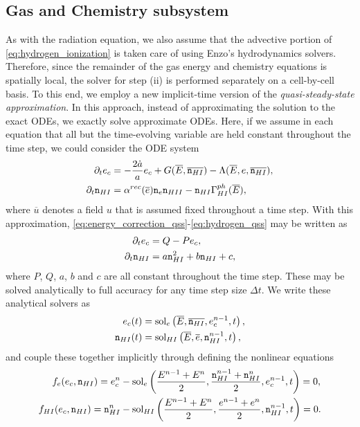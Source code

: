 \documentclass[letterpaper,10pt]{article}
\renewcommand{\(}{\left(}
\renewcommand{\)}{\right)}
\newcommand{\dt}{\Delta t}
\newcommand{\mn}{{\tt n}}
\begin{document}
\subsection{Gas and Chemistry subsystem}
\label{sec:analytic_solve}

As with the radiation equation, we also assume that the advective
portion of \eqref{eq:hydrogen_ionization} is taken care of using
Enzo's hydrodynamics solvers.  Therefore, since the remainder of the
gas energy and chemistry equations is spatially local, the solver for
step (ii) is performed separately on a cell-by-cell basis.  To this
end, we employ a new implicit-time version of the 
{\em quasi-steady-state approximation}.  In this approach, instead of
approximating the solution to the exact ODEs, we exactly solve
approximate ODEs.  Here, if we assume in each equation that all but the
time-evolving variable are held constant throughout the time step, we
could consider the ODE system 
\begin{align}
  \label{eq:energy_correction_qss}
  \partial_t e_c &= -\frac{2\dot{a}}{a}e_c + G(\overline{E},\overline{\mn_{HI}}) - \Lambda(\overline{E},e,\overline{\mn_{HI}}), \\
  \label{eq:hydrogen_qss}
  \partial_t \mn_{HI} &= \alpha^{rec}(\overline{e}) \mn_e \mn_{HII} - \mn_{HI} \Gamma_{HI}^{ph}(\overline{E}),
\end{align}
where $\overline{u}$ denotes a field $u$ that is assumed fixed
throughout a time step.  With this approximation,
\eqref{eq:energy_correction_qss}-\eqref{eq:hydrogen_qss} may be
written as
\begin{align}
  \label{eq:energy_correction_qss2}
  \partial_t e_c &= Q - Pe_c, \\
  \label{eq:hydrogen_qss2}
  \partial_t \mn_{HI} &= a \mn_{HI}^2 + b\mn_{HI} + c,
\end{align}
where $P$, $Q$, $a$, $b$ and $c$ are all constant throughout the time
step.  These may be solved analytically to full accuracy for any time step
size $\dt$.  We write these analytical solvers as
\begin{align}
  \label{eq:energy_correction_qss3}
  e_c(t) &= \text{sol}_e\left(\overline{E},\overline{\mn_{HI}},e_c^{n-1},t\right), \\
  \label{eq:hydrogen_qss3}
  \mn_{HI}(t) &= \text{sol}_{HI}\left(\overline{E},\overline{e},\mn_{HI}^{n-1},t\right),
\end{align}
and couple these together implicitly through defining the nonlinear
equations 
\begin{align}
  \label{eq:energy_correction_iqss}
  f_e(e_c,\mn_{HI}) = e_c^n &- \text{sol}_e\left(\frac{E^{n-1}+E^n}{2},\frac{\mn_{HI}^{n-1}+\mn_{HI}^n}{2},e_c^{n-1},t\right) = 0, \\
  \label{eq:hydrogen_iqss}
  f_{HI}(e_c,\mn_{HI}) = \mn_{HI}^n &- \text{sol}_{HI}\left(\frac{E^{n-1}+E^n}{2},\frac{e^{n-1}+e^n}{2},\mn_{HI}^{n-1},t\right) = 0.
\end{align}
\end{document}
